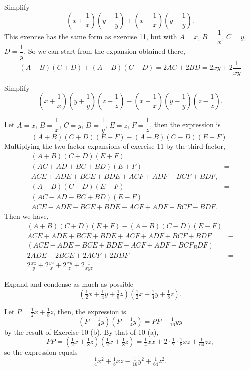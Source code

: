 \documentclass[DIN, pagenumber=false, fontsize=11pt, parskip=half]{scrartcl}
\begin{document}
\begin{problems}[from=1,step=1]
    \problem Simplify---
    \[
        \left(x + \frac{1}{x}\right)\left(y + \frac{1}{y}\right) + \left(x - \frac{1}{x}\right)\left(y - \frac{1}{y}\right).
    \]
    \answer This exercise has the same form as exercise 11, but with $A=x$, $B=\dfrac{1}{x}$, $C=y$, $D=\dfrac{1}{y}$. So we can start from the expansion obtained there,
    \[
        (A+B)(C+D) + (A-B)(C-D) = 2AC + 2BD = 2xy+2\frac{1}{xy}
    \]

    \problem Simplify---
    \[
        \left(x + \frac{1}{x}\right)\left(y + \frac{1}{y}\right)\left(z + \frac{1}{z}\right) - \left(x - \frac{1}{x}\right)\left(y - \frac{1}{y}\right)\left(z - \frac{1}{z}\right).
    \]

    \answer Let $A=x$, $B=\dfrac{1}{x}$, $C=y$, $D=\dfrac{1}{y}$, $E=z$, $F=\dfrac{1}{z}$, then the expression is
    \[
        (A+B)(C+D)(E+F) - (A-B)(C-D)(E-F).
    \]
    Multiplying the two-factor expansions of exercise 11 by the third factor,
    \begin{align*}
        (A+B)(C+D)(E+F) &=\\ 
            (AC+AD+BC+BD)(E+F) &=\\
            ACE+ADE+BCE+BDE+ACF+ADF+BCF+BDF,\\
        (A-B)(C-D)(E-F) &=\\ 
        (AC-AD-BC+BD)(E-F) &=\\
            ACE-ADE-BCE+BDE-ACF+ADF+BCF-BDF.
    \end{align*}
    Then we have,
    \begin{align*}
        (A+B)(C+D)(E+F) - (A-B)(C-D)(E-F) &=\\ 
        ACE+ADE+BCE+BDE+ACF+ADF+BCF+BDF &-\\ 
        (ACE-ADE-BCE+BDE-ACF+ADF+BCF_BDF)&=\\
        2ADE + 2BCE + 2ACF + 2BDF &=\\
        2\frac{xz}{y} + 2\frac{yz}{x} + 2\frac{xy}{z} + 2\frac{1}{xyz}
    \end{align*}


    \problem Expand and condense as much as possible---
    \[
        (\tfrac{1}{2}x + \tfrac{1}{4}y + \tfrac{1}{8}z)(\tfrac{1}{2}x - \tfrac{1}{4}y + \tfrac{1}{8}z).
    \]

    \answer Let $P = \tfrac{1}{2}x + \tfrac{1}{8}z$, then, the expression is
    \[
        (P + \tfrac{1}{4}y)(P - \tfrac{1}{4}y) = PP - \tfrac{1}{16}yy
    \]
    by the result of Exercise 10 (b). By that of 10 (a),
    \[
        PP = (\tfrac{1}{2}x + \tfrac{1}{8}z)(\tfrac{1}{2}x + \tfrac{1}{8}z) = \tfrac{1}{4}xx + 2 \cdot \tfrac{1}{2} \cdot \tfrac{1}{8}xz + \tfrac{1}{64}zz,
    \]
    so the expression equals
    \[
        \tfrac{1}{4}x^2 + \tfrac{1}{8}xz - \tfrac{1}{16}y^2 + \tfrac{1}{64}z^2.
    \]
\end{problems}
\end{document}
